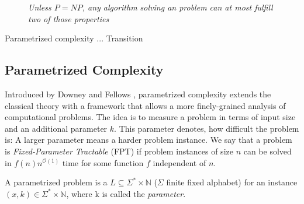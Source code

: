 




\begin{figure}
    \centering
{}
    \caption{\textit{Unless $P = NP$, any algorithm solving an \NPc problem can at most fulfill two of those properties}}
    \label{fig:npc}
\end{figure}

Parametrized complexity ... Transition

\subsection{Parametrized Complexity}

Introduced by Downey and Fellows \cite{Downey1999a}, parametrized complexity extends the classical theory with a framework that allows a more finely-grained analysis of computational problems. The idea is to measure a problem in terms of input size and an additional parameter $k$. This parameter denotes, how difficult the problem is: A larger parameter means a harder problem instance. We say that a problem is \textit{Fixed-Parameter Tractable} (FPT) if problem instances of size $n$ can be solved in $f(n)n^{\mathcal{O}(1)}$ time for some function $f$ independent of $n$. 


\begin{definition}
    A parametrized problem is a $L\subseteq\Sigma^*\times \mathbb{N}$ ($\Sigma$ finite fixed alphabet) for an instance $(x,k)\in \Sigma^*\times \mathbb{N}$, where k is called the \textit{parameter}.
\end{definition}

